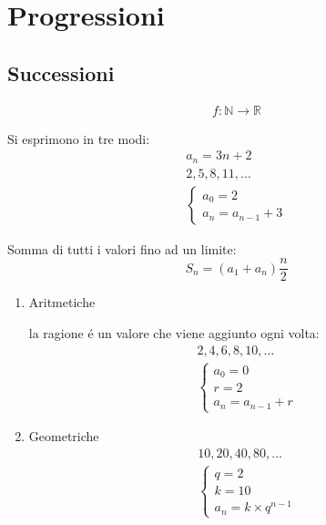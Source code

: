 \documentclass{article}
\title{\jobname}
\author{Eugenio Animali}
\begin{document}
\maketitle

\section{Progressioni}
\subsection{Successioni}
\begin{gather*}    
    f:\mathbb{N} \to \mathbb{R}
\end{gather*}

Si esprimono in tre modi:
\begin{gather}
    a_n=3n+2\\
    2,5,8,11,\dots\\
    \begin{cases}
        a_0=2\\
        a_n=a_{n-1}+3
    \end{cases}
\end{gather}

Somma di tutti i valori fino ad un limite:
\[S_n=(a_1+a_n)\frac{n}{2}\]
\begin{enumerate}
    \item Aritmetiche
    
    la ragione é un valore che viene aggiunto ogni volta:
    \begin{gather*}
        2,4,6,8,10,\dots\\
        \begin{cases}
            a_0=0\\
            r=2\\
            a_n=a_{n-1}+r
        \end{cases}
    \end{gather*}
    \item Geometriche
    \begin{gather*}
        10,20,40,80,\dots\\
        \begin{cases}
            q=2\\
            k=10\\
            a_n=k\times q^{n-1}
        \end{cases}
    \end{gather*}
\end{enumerate}
\end{document}
